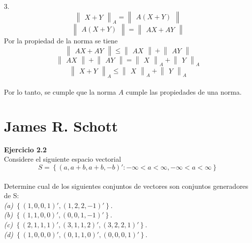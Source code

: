 \documentclass[12pt]{article}
\begin{document}
3.\\
$$\begin{Vmatrix} X+Y \end{Vmatrix}_A=\begin{Vmatrix} A(X+Y) \end{Vmatrix}$$
$$\begin{Vmatrix} A(X+Y) \end{Vmatrix}=\begin{Vmatrix} AX+AY \end{Vmatrix}$$
Por la propiedad de la norma se tiene
$$\begin{Vmatrix} AX+AY \end{Vmatrix} \leq  \begin{Vmatrix} AX \end{Vmatrix} +\begin{Vmatrix} AY \end{Vmatrix} $$
$$\begin{Vmatrix} AX \end{Vmatrix} +\begin{Vmatrix} AY \end{Vmatrix} = \begin{Vmatrix} X \end{Vmatrix}_A+\begin{Vmatrix} Y \end{Vmatrix}_A$$
$$\begin{Vmatrix} X+Y \end{Vmatrix}_A \leq \begin{Vmatrix} X \end{Vmatrix}_A+\begin{Vmatrix} Y \end{Vmatrix}_A$$
\\Por lo tanto, se cumple que la norma $A$ cumple las propiedades de una norma.


%
\section{James R. Schott}
\noindent \textbf{Ejercicio 2.2}\\
Considere el siguiente espacio vectorial $$S=\left\lbrace(a,a+b,a+b,-b)':-\infty<a<\infty,-\infty<a<\infty \right\rbrace$$\\
Determine cual de los siguientes conjuntos de vectores son conjuntos generadores de S:\\
\emph{(a)} $\left\lbrace(1,0,0,1)',(1,2,2,-1)' \right\rbrace.$\\
\emph{(b)} $\left\lbrace(1,1,0,0)',(0,0,1,-1)' \right\rbrace.$\\
\emph{(c)} $\left\lbrace(2,1,1,1)',(3,1,1,2)',(3,2,2,1)' \right\rbrace.$\\
\emph{(d)} $\left\lbrace(1,0,0,0)',(0,1,1,0)',(0,0,0,1)' \right\rbrace.$\\
\end{document}
